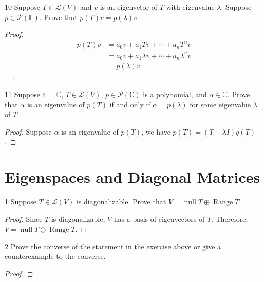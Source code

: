 \documentclass{article}
\newenvironment{problem}[1]{\begin{prob*}{#1}{}}{\end{prob*}}
\DeclareMathOperator{\Null}{null}
\begin{document}
\begin{problem}{10}
Suppose $T \in \mathcal{L}(V)$ and $v$ is an eigenvetor of $T$ with eigenvalue $\lambda$. Suppose $p \in \mathcal{P}(\mathbb{F})$. Prove that $p(T)v = p(\lambda)v$
\end{problem}
\begin{proof}
	\begin{equation*}
		\begin{aligned}
			p(T)v & = a_0v + a_1Tv + \cdots + a_nT^{n}v              \\
			      & = a_0v + a_1\lambda v + \cdots + a_n\lambda^{n}v \\
			      & = p(\lambda)v
		\end{aligned}
	\end{equation*}
\end{proof}

\begin{problem}{11}
Suppose $\mathbb{F} = \mathbb{C}$, $T \in \mathcal{L}(V)$, $p \in \mathcal{P}(\mathbb{C})$ is a polynomial, and $\alpha \in \mathbb{C}$. Prove that $\alpha$ is an eigenvalue of $p(T)$ if and only if $\alpha = p(\lambda)$ for some eigenvalue $\lambda$ of $T$.
\end{problem}
\begin{proof}
	Suppose $\alpha$ is an eigenvalue of $p(T)$,
	we have $p(T) = (T-\lambda I)q(T)$.
\end{proof}

\section{Eigenspaces and Diagonal Matrices}

\begin{problem}{1}
Suppose $T \in \mathcal{L}(V)$ is diagonalizable. Prove that $V = \Null T \oplus \operatorname{Range} T$.
\end{problem}
\begin{proof}
	Since $T$ is diagonalizable, $V$ has a basis of eigenvectors of $T$.
	Therefore, $V = \Null T \oplus \operatorname{Range} T$.
\end{proof}

\begin{problem}{2}
Prove the converse of the statement in the exercise above
or give a counterexample to the converse.
\end{problem}

\begin{proof}
\end{proof}
\end{document}
